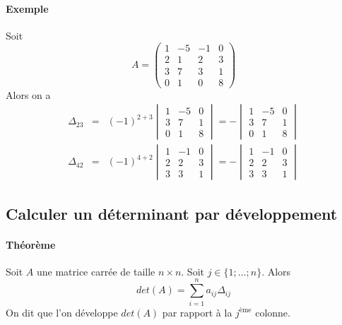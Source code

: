 \paragraph{Exemple} Soit
$$A = \begin{pmatrix}
  1 & -5 & -1 & 0 \\
  2 & 1 & 2 & 3 \\
  3 & 7 & 3 & 1 \\
  0 & 1 & 0 & 8
\end{pmatrix}$$
Alors on a
\begin{eqnarray*}
  \Delta_{23} &=& (-1)^{2+3} \begin{vmatrix} 1 & -5 & 0 \\ 3 & 7 & 1 \\ 0 & 1 & 8 \end{vmatrix}
    = - \begin{vmatrix} 1 & -5 & 0 \\ 3 & 7 & 1 \\ 0 & 1 & 8 \end{vmatrix} \\
  \Delta_{42} &=& (-1)^{4 + 2} \begin{vmatrix} 1 & -1 & 0 \\ 2 & 2 & 3 \\ 3 & 3 & 1 \end{vmatrix}
    = - \begin{vmatrix} 1 & -1 & 0 \\ 2 & 2 & 3 \\ 3 & 3 & 1 \end{vmatrix}
\end{eqnarray*}

%
\subsection{Calculer un déterminant par développement}
%
\paragraph{Théorème} Soit $A$ une matrice carrée de taille $n\times n$. Soit $j \in \{1; \ldots; n\}$. Alors
$$det(A) = \sum_{i=1}^{n} a_{ij} \Delta_{ij}$$
On dit que l'on développe $det(A)$ par rapport à la $j^{\text{ème}}$ colonne.


